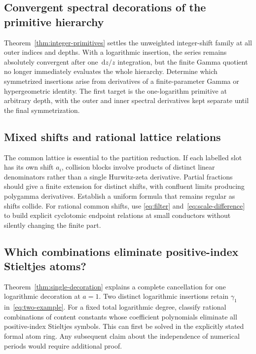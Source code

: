 \documentclass[11pt,oneside]{article}
\numberwithin{equation}{section}
\theoremstyle{definition}
\theoremstyle{remark}
\newcommand{\dd}{\,\mathrm d}
\begin{document}
\subsection{Convergent spectral decorations of the primitive hierarchy}

Theorem~\ref{thm:integer-primitives} settles the unweighted integer-shift
family at all outer indices and depths. With a logarithmic insertion, the
series remains absolutely convergent after one $\dd z/z$ integration, but
the finite Gamma quotient no longer immediately evaluates the whole
hierarchy. Determine which symmetrized insertions arise from derivatives of
a finite-parameter Gamma or hypergeometric identity. The first target is the
one-logarithm primitive at arbitrary depth, with the outer and inner
spectral derivatives kept separate until the final symmetrization.

\subsection{Mixed shifts and rational lattice relations}

The common lattice is essential to the partition reduction. If each labelled
slot has its own shift $a_i$, collision blocks involve products of distinct
linear denominators rather than a single Hurwitz-zeta derivative. Partial
fractions should give a finite extension for distinct shifts, with confluent
limits producing polygamma derivatives. Establish a uniform formula that
remains regular as shifts collide. For rational common shifts, use
\eqref{eq:filter} and~\eqref{eq:scale-difference} to build explicit cyclotomic
endpoint relations at small conductors without silently changing the finite
part.

\subsection{Which combinations eliminate positive-index Stieltjes atoms?}

Theorem~\ref{thm:single-decoration} explains a complete cancellation for one
logarithmic decoration at $a=1$. Two distinct logarithmic insertions retain
$\gamma_1$ in~\eqref{eq:two-example}. For a fixed total logarithmic degree,
classify rational combinations of content constants whose coefficient
polynomials eliminate all positive-index Stieltjes symbols. This can first
be solved in the explicitly stated formal atom ring. Any subsequent claim
about the independence of numerical periods would require additional proof.
\end{document}
